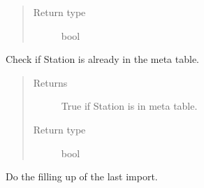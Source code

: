 \documentclass[letterpaper,10pt,english]{sphinxmanual}
\begin{document}
\begin{fulllineitems}
\begin{fulllineitems}
\begin{quote}
\begin{description}
\item[{Return type}] \leavevmode
\sphinxAtStartPar
bool

\end{description}\end{quote}

\end{fulllineitems}


\begin{fulllineitems}
\label{\detokenize{weatherDB:weatherDB.station.StationBase.isin_meta}}
\sphinxAtStartPar
Check if Station is already in the meta table.
\begin{quote}\begin{description}
\item[{Returns}] \leavevmode
\sphinxAtStartPar
True if Station is in meta table.

\item[{Return type}] \leavevmode
\sphinxAtStartPar
bool

\end{description}\end{quote}

\end{fulllineitems}


\begin{fulllineitems}
\label{\detokenize{weatherDB:weatherDB.station.StationBase.last_imp_fillup}}
\sphinxAtStartPar
Do the filling up of the last import.

\end{fulllineitems}


\begin{fulllineitems}
\label{\detokenize{weatherDB:weatherDB.station.StationBase.last_imp_qc}}
\end{fulllineitems}


\end{fulllineitems}
\end{document}
